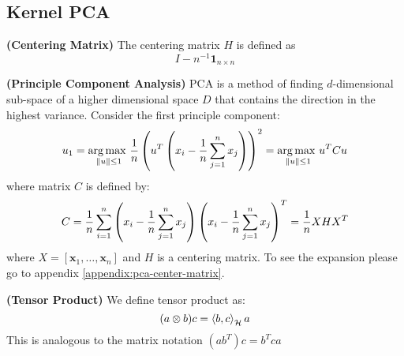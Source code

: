 \subsection{Kernel PCA}

\begin{definition}{\textbf{(Centering Matrix)}}
    The centering matrix $H$ is defined as 
    \begin{equation*}
        I-n^{-1}\boldsymbol 1_{n\times n}
    \end{equation*}
\end{definition}

\begin{definition}{\textbf{(Principle Component Analysis)}}
    PCA is a method of finding $d$-dimensional sub-space of a higher dimensional space $D$ that contains the direction in the highest variance. Consider the first principle component:
    \begin{equation*}
        u_1 = \underset{\left\lVert u\right\rVert\le1}{\arg\max \ }\frac{1}{n}\left( u^T\left( x_i - \frac{1}{n}\sum^n_{j=1}x_j \right) \right)^2 = \underset{\left\lVert u\right\rVert\le1}{\arg\max \ } u^TCu
    \end{equation*}
    where matrix $C$ is defined by:
    \begin{equation*}
        C = \frac{1}{n}\sum^n_{i=1}\left( x_i-\frac{1}{n}\sum^n_{j=1}x_j \right)\left( x_i-\frac{1}{n}\sum^n_{j=1}x_j \right)^T = \frac{1}{n}XHX^T
    \end{equation*}
    where $X = [\boldsymbol{x}_1,\dots,\boldsymbol{x}_n]$ and $H$ is a centering matrix. To see the expansion please go to appendix \ref{appendix:pca-center-matrix}.
\end{definition}

\begin{definition}{\textbf{(Tensor Product)}}
    We define tensor product as:
    \begin{equation*}
        (a\otimes b)c = \left\langle b,c \right\rangle_\mathcal{H}a
    \end{equation*}
    This is analogous to the matrix notation $(ab^T)c = b^Tca$
\end{definition}

